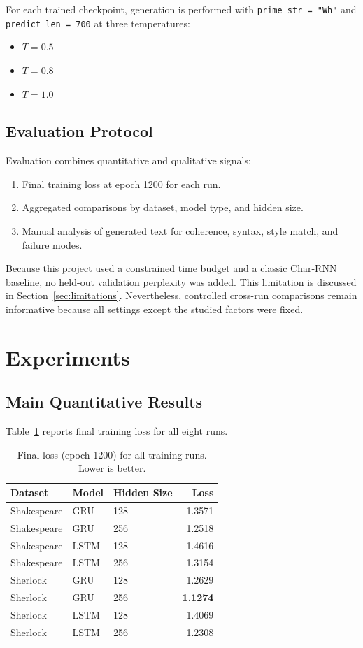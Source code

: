 \documentclass[10pt,twocolumn,letterpaper]{article}
\begin{document}
For each trained checkpoint, generation is performed with \texttt{prime\_str = "Wh"} and \texttt{predict\_len = 700} at three temperatures:
\begin{itemize}
\item $T = 0.5$
\item $T = 0.8$
\item $T = 1.0$
\end{itemize}

\subsection{Evaluation Protocol}
Evaluation combines quantitative and qualitative signals:
\begin{enumerate}
\item Final training loss at epoch 1200 for each run.
\item Aggregated comparisons by dataset, model type, and hidden size.
\item Manual analysis of generated text for coherence, syntax, style match, and failure modes.
\end{enumerate}

Because this project used a constrained time budget and a classic Char-RNN baseline, no held-out validation perplexity was added. This limitation is discussed in Section~\ref{sec:limitations}. Nevertheless, controlled cross-run comparisons remain informative because all settings except the studied factors were fixed.

\section{Experiments}
\subsection{Main Quantitative Results}
Table~\ref{tab:mainloss} reports final training loss for all eight runs.

\begin{table}[t]
\centering
\caption{Final loss (epoch 1200) for all training runs. Lower is better.}
\label{tab:mainloss}
\small
\begin{tabular}{lllr}
\toprule
Dataset & Model & Hidden Size & Loss \\
\midrule
Shakespeare & GRU & 128 & 1.3571 \\
Shakespeare & GRU & 256 & 1.2518 \\
Shakespeare & LSTM & 128 & 1.4616 \\
Shakespeare & LSTM & 256 & 1.3154 \\
Sherlock & GRU & 128 & 1.2629 \\
Sherlock & GRU & 256 & \textbf{1.1274} \\
Sherlock & LSTM & 128 & 1.4069 \\
Sherlock & LSTM & 256 & 1.2308 \\
\bottomrule
\end{tabular}
\end{table}
\end{document}
